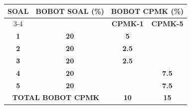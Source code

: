 \documentclass[11pt,letterpaper]{article}
\begin{document}
\begin{center}
  \begin{tabular}{|c|c|c|c|}
    \hline
    \multirow{2}{*}{\textbf{SOAL}}                  & \multirow{2}{*}{\textbf{BOBOT SOAL (\%)}} & \multicolumn{2}{c|}{\textbf{BOBOT CPMK (\%)}}                   \\ \cline{3-4}
                                                    &                                           & \textbf{CPMK-1}                               & \textbf{CPMK-5} \\ \hline
    \textbf{1}                                      & \textbf{20}                               & \textbf{5}                                    &                 \\ \hline
    \textbf{2}                                      & \textbf{20}                               & \textbf{2.5}                                  &                 \\ \hline
    \textbf{3}                                      & \textbf{20}                               & \textbf{2.5}                                  &                 \\ \hline
    \textbf{4}                                      & \textbf{20}                               &                                               & \textbf{7.5}    \\ \hline
    \textbf{5}                                      & \textbf{20}                               &                                               & \textbf{7.5}    \\ \hline
    \multicolumn{2}{|c|}{\textbf{TOTAL BOBOT CPMK}} & \textbf{10}                               & \textbf{15}                                                     \\ \hline
  \end{tabular}
\end{center}
\end{document}
